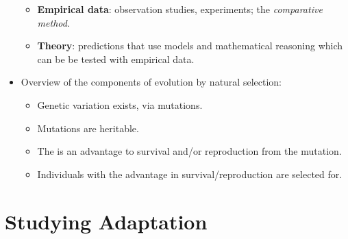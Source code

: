 \documentclass[12pt,a4paper]{article}
\begin{document}
\begin{itemize}
\begin{itemize}
            \item \textbf{Empirical data}: {\color{o-Sun}observation} studies, experiments; the \textit{comparative method}.
            \item \textbf{Theory}: {\color{o-Sun}predictions} that use models and mathematical reasoning which can be be {\color{o-Sun}tested} with empirical data.
        \end{itemize}
    \item Overview of the components of evolution by natural selection:
        \begin{itemize}
            \item Genetic variation exists, via mutations.
            \item Mutations are heritable.
            \item The is an advantage to survival and/or reproduction from the mutation.
            \item Individuals with the advantage in survival/reproduction are selected for.
        \end{itemize}
\end{itemize}

\clearpage
\setcounter{section}{9}
\section{Studying Adaptation}
\end{document}
